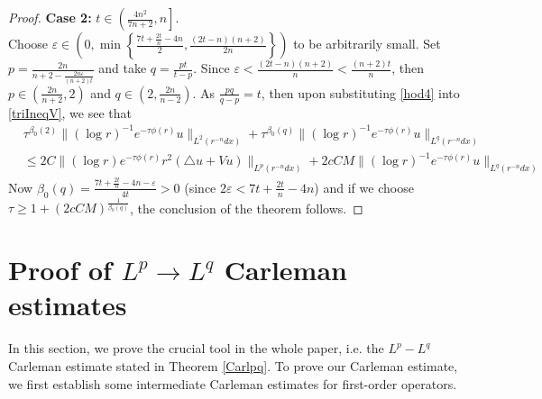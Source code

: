 \documentclass[11pt]{amsart}
\theoremstyle{plain}
\numberwithin{equation}{section}
\begin{document}
\begin{proof}
{\bf Case 2:} $t \in{\left( {\frac{4n^2}{7n+2}, n} \right] }$. \\
Choose ${\varepsilon} \in {\left( {0, \min{\left\{{\frac{7t+\frac{2t}n-4n}{2},
\frac{(2t-n)(n+2)}{2n}}\right\}}} \right) }$ to be arbitrarily small. Set $p =
\frac{2n}{n + 2 - \frac{2n{\varepsilon}}{{\left( {n+2} \right) }t} }$ and take $q =
\frac{pt}{t-p}$. Since ${\varepsilon}
<\frac{(2t-n)(n+2)}{n}<\frac{(n+2)t}{n}$, then $p \in
{\left( {\frac{2n}{n+2}, 2} \right) }$ and $q \in {\left( {2, \frac{2n}{n-2}} \right) }$. As
$\frac{pq}{q-p} = t$, then upon substituting \eqref{hod4} into
\eqref{triIneqV}, we see that
\begin{align*}
&\tau^{{\beta}_0{\left( {2} \right) }} \|(\log r)^{-1} e^{-\tau \phi(r)}u\|_{L^2(r^{-n}dx)}
+\tau^{{\beta}_0{\left( {q} \right) }} \|(\log r)^{-1} e^{-\tau \phi(r)}u\|_{L^q(r^{-n}dx)} \nonumber \\
&\le 2 C\|(\log r) e^{-\tau \phi(r)} r^2 (\triangle u + V u)\|_{L^p(r^{-n} dx)}
+ 2 c C M \|(\log r)^{-1} e^{-\tau \phi(r)} u\|_{L^q(r^{-n} dx)}
\label{triIneqV}
\end{align*}
Now ${\beta}_0{\left( {q} \right) } = \frac {7t+\frac{2t}n-4n-{\varepsilon}}{4t} >0$ (since $2{\varepsilon} <7t+\frac{2t}n-4n$) and if we choose $\tau \ge 1 + {\left( {2 c C M} \right) }^{\frac 1 {{\beta}_0{\left( {q} \right) }}}$, the conclusion of the theorem follows.
\end{proof}

\section{Proof of $L^p\to L^{q}$ Carleman estimates }
\label{CarlProofs}

In this section, we prove the crucial tool in the whole paper, i.e. the $L^p - L^q$ Carleman estimate stated in Theorem \ref{Carlpq}.
To prove our Carleman estimate, we first establish some intermediate Carleman estimates for first-order operators.
\end{document}
